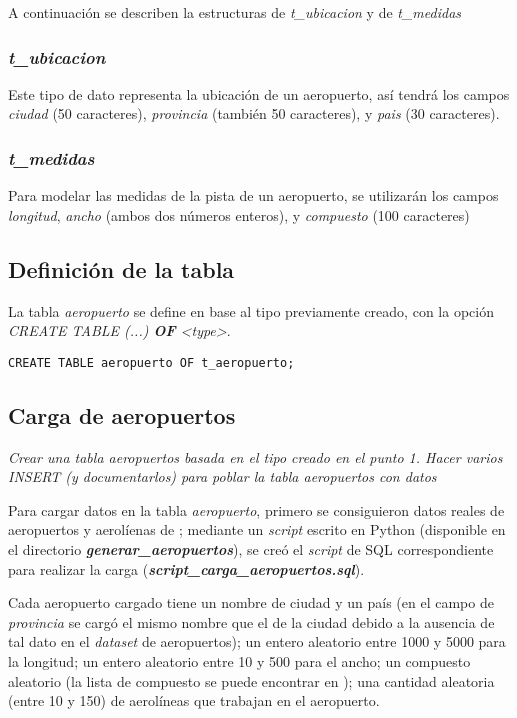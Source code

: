 A continuación se describen la estructuras de \emph{t\_ubicacion} y de \emph{t\_medidas}  

\subsubsection{\emph{t\_ubicacion}}

Este tipo de dato representa la ubicación de un aeropuerto, así tendrá los campos \emph{ciudad} (50 caracteres), \emph{provincia} (también 50 caracteres), y \emph{pais} (30 caracteres). 

\subsubsection{\emph{t\_medidas}}

Para modelar las medidas de la pista de un aeropuerto, se utilizarán los campos \emph{longitud}, \emph{ancho} (ambos dos números enteros), y \emph{compuesto} (100 caracteres)  

\subsection{Definición de la tabla}

La tabla \emph{aeropuerto} se define en base al tipo previamente creado, con la opción \emph{CREATE TABLE (...) \textbf{OF} <type>}. 

\vspace*{5mm}
\lstset{style=sql}
\begin{lstlisting}
CREATE TABLE aeropuerto OF t_aeropuerto;
\end{lstlisting}

\subsection{Carga de aeropuertos}

\emph{Crear una tabla aeropuertos basada en el tipo creado en el punto 1. Hacer varios INSERT (y documentarlos) para poblar la tabla aeropuertos con datos} 

Para cargar datos en la tabla \emph{aeropuerto}, primero se consiguieron datos reales de aeropuertos y aerolíenas de \cite{datasets}; mediante un \emph{script} escrito en Python (disponible en el directorio \textbf{\emph{generar\_aeropuertos}}), se creó el \emph{script} de SQL correspondiente para realizar la carga (\textbf{\emph{script\_carga\_aeropuertos.sql}}).

Cada aeropuerto cargado tiene un nombre de ciudad y un país (en el campo de \emph{provincia} se cargó el mismo nombre que el de la ciudad debido a la ausencia de tal dato en el \emph{dataset} de aeropuertos); un entero aleatorio entre 1000 y 5000 para la longitud; un entero aleatorio entre 10 y 500 para el ancho; un compuesto aleatorio (la lista de compuesto se puede encontrar en \cite{compuestos}); una cantidad aleatoria (entre 10 y 150) de aerolíneas que trabajan en el aeropuerto.

